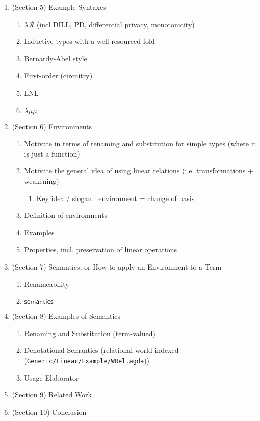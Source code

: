 \documentclass[runningheads]{llncs}
\begin{document}
\begin{enumerate}
\begin{enumerate}
  \end{enumerate}
\item (Section 5) Example Syntaxes
  \begin{enumerate}
  \item $\lambda\mathcal{R}$ (incl DILL, PD, differential privacy, monotonicity)
  \item Inductive types with a well resourced fold
  \item Bernardy-Abel style
  \item First-order (circuitry)
  \item LNL
  \item $\lambda\mu\tilde{\mu}$
  \end{enumerate}
\item (Section 6) Environments
  \begin{enumerate}
  \item Motivate in terms of renaming and substitution for simple types (where it is just a function)
  \item Motivate the general idea of using linear relations (i.e. transformations + weakening)
    \begin{enumerate}
    \item Key idea / slogan : environment = change of basis
    \end{enumerate}
  \item Definition of environments
  \item Examples
  \item Properties, incl. preservation of linear operations
  \end{enumerate}
\item (Section 7) Semantics, or How to apply an Environment to a Term
  \begin{enumerate}
  \item Renameability
  \item $\mathsf{semantics}$
  \end{enumerate}
\item (Section 8) Examples of Semantics
  \begin{enumerate}
  \item Renaming and Substitution (term-valued)
  \item Denotational Semantics (relational world-indexed (\texttt{Generic/Linear/Example/WRel.agda}))
  \item Usage Elaborator
  \end{enumerate}
\item (Section 9) Related Work
\item (Section 10) Conclusion
\end{enumerate}
\end{document}

